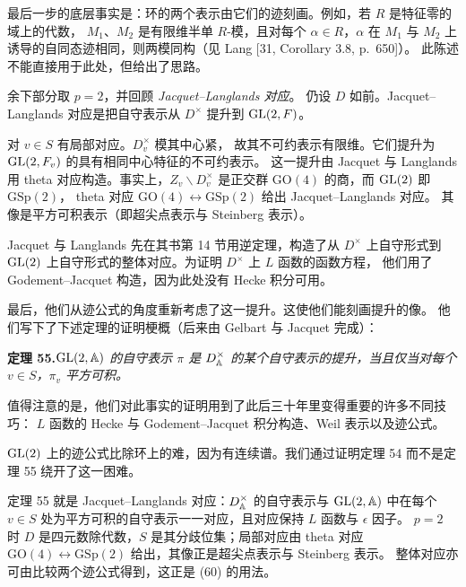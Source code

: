 最后一步的底层事实是：环的两个表示由它们的迹刻画。例如，若 $R$ 是特征零的域上的代数，
$M_{1}$、$M_{2}$ 是有限维半单 $R$-模，且对每个 $\alpha\in R$，$\alpha$ 在 $M_{1}$ 与
$M_{2}$ 上诱导的自同态迹相同，则两模同构（见 Lang [31, Corollary 3.8, p.\ 650]）。
此陈述不能直接用于此处，但给出了思路。

余下部分取 $p=2$，并回顾 \emph{Jacquet--Langlands 对应}。
仍设 $D$ 如前。Jacquet--Langlands 对应是把自守表示从 $D^{\times}$ 提升到 $\mathrm{GL}(2,F)$。

对 $v\in S$ 有局部对应。$D_{v}^{\times}$ 模其中心紧，
故其不可约表示有限维。它们提升为 $\mathrm{GL}(2,F_{v})$ 的具有相同中心特征的不可约表示。
这一提升由 Jacquet 与 Langlands 用 theta 对应构造。事实上，$Z_{v}\backslash D_{v}^{\times}$
是正交群 $\mathrm{GO}(4)$ 的商，而 $\mathrm{GL}(2)$ 即 $\mathrm{GSp}(2)$，
theta 对应 $\mathrm{GO}(4)\leftrightarrow\mathrm{GSp}(2)$ 给出 Jacquet--Langlands 对应。
其像是平方可积表示（即超尖点表示与 Steinberg 表示）。

Jacquet 与 Langlands 先在其书第 14 节用逆定理，构造了从 $D^{\times}$ 上自守形式到
$\mathrm{GL}(2)$ 上自守形式的整体对应。为证明 $D^{\times}$ 上 $L$ 函数的函数方程，
他们用了 Godement--Jacquet 构造，因为此处没有 Hecke 积分可用。

最后，他们从迹公式的角度重新考虑了这一提升。这使他们能刻画提升的像。
他们写下了下述定理的证明梗概（后来由 Gelbart 与 Jacquet 完成）：

\par\medskip\noindent\textbf{定理 55.}\quad\emph{$\mathrm{GL}(2,\mathbb{A})$ 的自守表示 $\pi$ 是
$D_{\mathbb{A}}^{\times}$ 的某个自守表示的提升，当且仅当对每个 $v\in S$，$\pi_{v}$ 平方可积。}

\smallskip
值得注意的是，他们对此事实的证明用到了此后三十年里变得重要的许多不同技巧：
$L$ 函数的 Hecke 与 Godement--Jacquet 积分构造、Weil 表示以及迹公式。

$\mathrm{GL}(2)$ 上的迹公式比除环上的难，因为有连续谱。我们通过证明定理 54 而不是定理 55
绕开了这一困难。

\begin{annote}
定理 55 就是 Jacquet--Langlands 对应：$D_{\mathbb{A}}^{\times}$ 的自守表示与 $\mathrm{GL}(2,\mathbb{A})$ 中在每个
$v\in S$ 处为平方可积的自守表示一一对应，且对应保持 $L$ 函数与 $\epsilon$ 因子。
$p=2$ 时 $D$ 是四元数除代数，$S$ 是其分歧位集；局部对应由 theta 对应
$\mathrm{GO}(4)\leftrightarrow\mathrm{GSp}(2)$ 给出，其像正是超尖点表示与 Steinberg 表示。
整体对应亦可由比较两个迹公式得到，这正是 (60) 的用法。
\par{}
\end{annote}

